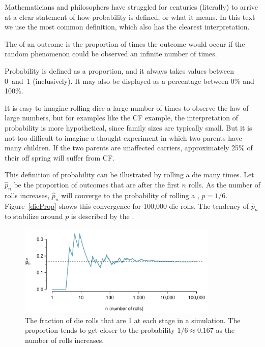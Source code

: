 Mathematicians and philosophers have struggled for centuries (literally) to arrive at a clear statement of how probability is defined, or what it means.  In this text we use the most common definition, which also has the clearest interpretation.

\begin{termBox}{
The  of an outcome is the proportion of times the outcome would occur if the random phenomenon could be observed an infinite number of times.}
\end{termBox}

Probability is defined as a proportion, and it always takes values between 0~and~1 (inclusively). It may also be displayed as a percentage between 0\% and 100\%.

It is easy to imagine rolling dice a large number of times to observe the law of large numbers, but for examples like the CF example, the interpretation of probability is more hypothetical, since family sizes are typically small.  But it is not too difficult to imagine a thought experiment in which two parents have many children.  If the two parents are unaffected carriers, approximately 25\% of their off spring will suffer from CF.

This definition of probability can be illustrated by rolling a die many times. Let $\hat{p}_n$ be the proportion of outcomes that are  after the first $n$ rolls. As the number of rolls increases, $\hat{p}_n$ will converge to the probability of rolling a , $p = 1/6$. Figure~\ref{dieProp} shows this convergence for 100,000 die rolls. The tendency of $\hat{p}_n$ to stabilize around $p$ is described by the . 

\begin{figure}[bt]
\centering
\includegraphics[width=0.85\textwidth]{ch_probability_oi_biostat/figures/dieProp/dieProp}
\caption{The fraction of die rolls that are 1 at each stage in a simulation. The proportion tends to get closer to the probability $1/6 \approx 0.167$ as the number of rolls increases.}
\label{fig:dieProp}
\end{figure}

